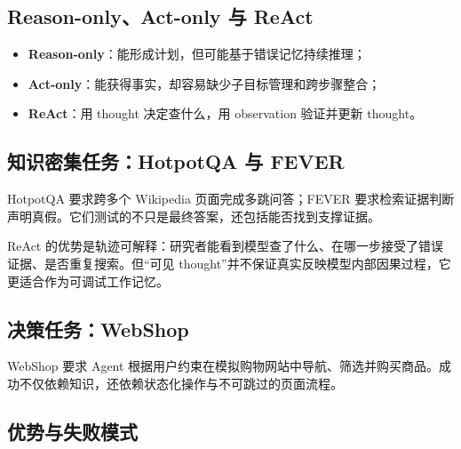 \documentclass[a4paper]{article}
\begin{document}
\subsection{Reason-only、Act-only 与 ReAct}


\begin{itemize}
    \item \textbf{Reason-only}：能形成计划，但可能基于错误记忆持续推理；
    \item \textbf{Act-only}：能获得事实，却容易缺少子目标管理和跨步骤整合；
    \item \textbf{ReAct}：用 thought 决定查什么，用 observation 验证并更新 thought。
\end{itemize}

\subsection{知识密集任务：HotpotQA 与 FEVER}

HotpotQA 要求跨多个 Wikipedia 页面完成多跳问答；FEVER 要求检索证据判断声明真假。它们测试的不只是最终答案，还包括能否找到支撑证据。


ReAct 的优势是轨迹可解释：研究者能看到模型查了什么、在哪一步接受了错误证据、是否重复搜索。但“可见 thought”并不保证真实反映模型内部因果过程，它更适合作为可调试工作记忆。

\subsection{决策任务：WebShop}

WebShop 要求 Agent 根据用户约束在模拟购物网站中导航、筛选并购买商品。成功不仅依赖知识，还依赖状态化操作与不可跳过的页面流程。


\subsection{优势与失败模式}

\end{document}
